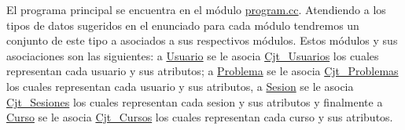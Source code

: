 El programa principal se encuentra en el módulo \mbox{\hyperlink{program_8cc}{program.\+cc}}. Atendiendo a los tipos de datos sugeridos en el enunciado para cada módulo tendremos un conjunto de este tipo a asociados a sus respectivos módulos. Estos módulos y sus asociaciones son las siguientes\+: a \mbox{\hyperlink{class_usuario}{Usuario}} se le asocia \mbox{\hyperlink{class_cjt___usuarios}{Cjt\+\_\+\+Usuarios}} los cuales representan cada usuario y sus atributos; a \mbox{\hyperlink{class_problema}{Problema}} se le asocia \mbox{\hyperlink{class_cjt___problemas}{Cjt\+\_\+\+Problemas}} los cuales representan cada usuario y sus atributos, a \mbox{\hyperlink{class_sesion}{Sesion}} se le asocia \mbox{\hyperlink{class_cjt___sesiones}{Cjt\+\_\+\+Sesiones}} los cuales representan cada sesion y sus atributos y finalmente a \mbox{\hyperlink{class_curso}{Curso}} se le asocia \mbox{\hyperlink{class_cjt___cursos}{Cjt\+\_\+\+Cursos}} los cuales representan cada curso y sus atributos. ~\newline
 